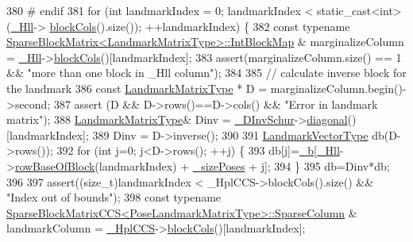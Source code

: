 \begin{DoxyCode}
380 \textcolor{preprocessor}{# endif}
381   \textcolor{keywordflow}{for} (\textcolor{keywordtype}{int} landmarkIndex = 0; landmarkIndex < static\_cast<int>(\hyperlink{classg2o_1_1BlockSolver_a88d4c24df24a8fb72be1a4e4cff03d71}{\_Hll}->
      \hyperlink{classg2o_1_1SparseBlockMatrix_a8e53797223fff106487d0b0080a3e36e}{blockCols}().size()); ++landmarkIndex) \{
382     \textcolor{keyword}{const} \textcolor{keyword}{typename} \hyperlink{classg2o_1_1SparseBlockMatrix_aaa6ca1ae454ed70f62992b6401645f4e}{SparseBlockMatrix<LandmarkMatrixType>::IntBlockMap}
      & marginalizeColumn = \hyperlink{classg2o_1_1BlockSolver_a88d4c24df24a8fb72be1a4e4cff03d71}{\_Hll}->\hyperlink{classg2o_1_1SparseBlockMatrix_a8e53797223fff106487d0b0080a3e36e}{blockCols}()[landmarkIndex];
383     assert(marginalizeColumn.size() == 1 && \textcolor{stringliteral}{"more than one block in \_Hll column"});
384 
385     \textcolor{comment}{// calculate inverse block for the landmark}
386     \textcolor{keyword}{const} \hyperlink{classg2o_1_1BlockSolver_afd898a666343291129d37a979e23ded6}{LandmarkMatrixType} * D = marginalizeColumn.begin()->second;
387     assert (D && D->rows()==D->cols() && \textcolor{stringliteral}{"Error in landmark matrix"});
388     \hyperlink{classg2o_1_1BlockSolver_afd898a666343291129d37a979e23ded6}{LandmarkMatrixType}& Dinv = \hyperlink{classg2o_1_1BlockSolver_ad6a1a8f17c8fb854962a8204c79bc981}{\_DInvSchur}->\hyperlink{classg2o_1_1SparseBlockMatrixDiagonal_a762097ac116728fec0cc64cf05610a96}{diagonal}()[landmarkIndex];
389     Dinv = D->inverse();
390 
391     \hyperlink{classg2o_1_1BlockSolver_a19ade5e432f32e46557192ae75074304}{LandmarkVectorType}  db(D->rows());
392     \textcolor{keywordflow}{for} (\textcolor{keywordtype}{int} j=0; j<D->rows(); ++j) \{
393       db[j]=\hyperlink{classg2o_1_1Solver_a52c92c9bf5db0da3322da3a02dbeb245}{\_b}[\hyperlink{classg2o_1_1BlockSolver_a88d4c24df24a8fb72be1a4e4cff03d71}{\_Hll}->\hyperlink{classg2o_1_1SparseBlockMatrix_a176a2dbe00711e248ea25dc1995c6b4c}{rowBaseOfBlock}(landmarkIndex) + 
      \hyperlink{classg2o_1_1BlockSolver_a39ec000379885ce09cdd8c23ab6d4567}{\_sizePoses} + j];
394     \}
395     db=Dinv*db;
396 
397     assert((\textcolor{keywordtype}{size\_t})landmarkIndex < \_HplCCS->blockCols().size() && \textcolor{stringliteral}{"Index out of bounds"});
398     \textcolor{keyword}{const} \textcolor{keyword}{typename} \hyperlink{classg2o_1_1SparseBlockMatrixCCS_a4fc5dfe0a9ff9bd62065ca4b17f25bc1}{SparseBlockMatrixCCS<PoseLandmarkMatrixType>::SparseColumn}
      & landmarkColumn = \hyperlink{classg2o_1_1BlockSolver_ab54eb7bb13f8b3a8a5f135a98f2050ec}{\_HplCCS}->\hyperlink{classg2o_1_1SparseBlockMatrixCCS_ae43c6599984015bdc3d481266e1555ea}{blockCols}()[landmarkIndex];

\end{DoxyCode}
